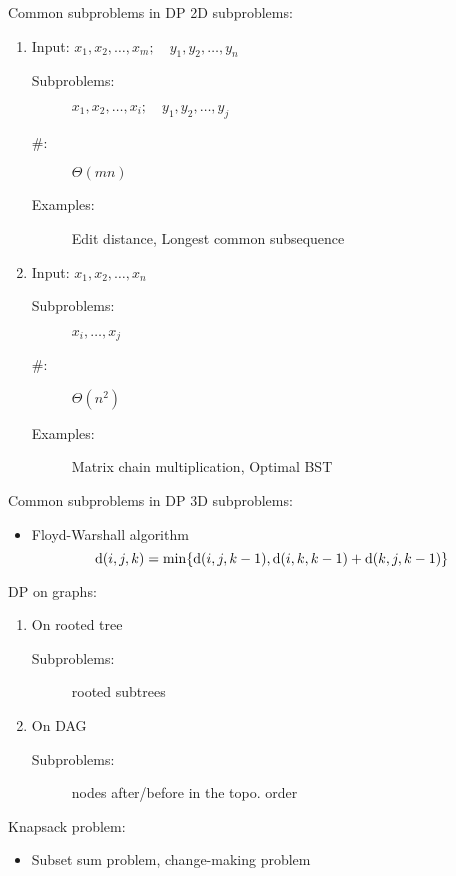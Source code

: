 \begin{frame}{Common subproblems in DP}
  2D subproblems:
  \begin{enumerate}
	\item Input: $x_{1}, x_{2}, \dots, x_{m}; \quad y_{1}, y_{2}, \dots, y_{n}$
	  \begin{description}
		\item[Subproblems:] $x_{1}, x_{2}, \dots, x_{i}; \quad y_{1}, y_{2}, \dots, y_{j}$
		\item[\#:] $\Theta(mn)$
		\item[Examples:] Edit distance, Longest common subsequence
	  \end{description}
	  \pause
	  \vspace{0.30cm}
	\item Input: $x_{1}, x_{2}, \dots, x_{n}$
	  \begin{description}
		\item[Subproblems:] $x_{i}, \dots, x_{j}$
		\item[\#:] $\Theta(n^{2})$
		\item[Examples:] Matrix chain multiplication, Optimal BST
	  \end{description}
  \end{enumerate}
\end{frame}
\begin{frame}{Common subproblems in DP}
  3D subproblems:
  \begin{itemize}
	\item Floyd-Warshall algorithm
	  \[
		\text{d}(i,j,k) = \min \{\text{d}(i,j,k-1), \text{d}(i,k,k-1) + \text{d}(k,j,k-1)\}
	  \]
  \end{itemize}

  \pause
  DP on graphs:
  \begin{enumerate}
	\item On rooted tree
	  \begin{description}
		\item[Subproblems:] rooted subtrees
	  \end{description}
	\item On DAG
	  \begin{description}
		\item[Subproblems:] nodes after/before in the topo. order
	  \end{description}
  \end{enumerate}

  \pause
  \vspace{0.30cm}
  Knapsack problem:
  \begin{itemize}
	\item Subset sum problem, change-making problem
  \end{itemize}
\end{frame}
